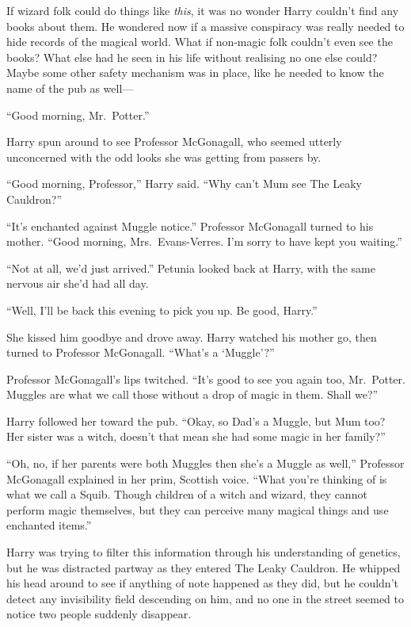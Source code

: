 If wizard folk could do things like \emph{this}, it was no wonder
Harry couldn’t find any books about them. He wondered
now if a massive conspiracy was really needed to hide
records of the magical world. What if non-magic folk
couldn’t even see the books? What else had he seen in
his life without realising no one else could? Maybe some
other safety mechanism was in place, like he needed to
know the name of the pub as well—

“Good morning, Mr.~Potter.”

Harry spun around to see Professor McGonagall, who
seemed utterly unconcerned with the odd
looks she was getting from passers by.

“Good morning, Professor,” Harry said. “Why can’t Mum
see The Leaky Cauldron?”

“It’s enchanted against Muggle notice.” Professor McGonagall
turned to his mother. “Good morning, Mrs.~Evans-Verres.
I’m sorry to have kept you waiting.”

“Not at all, we’d just arrived.” Petunia looked back at
Harry, with the same nervous air she’d had all day.

“Well, I’ll be back this evening to pick you up. Be good, Harry.”

She kissed him goodbye and drove away. Harry watched his mother
go, then turned to Professor McGonagall. “What’s a ‘Muggle’?”

Professor McGonagall’s lips twitched. “It’s good to see you
again too, Mr.~Potter. Muggles are what we call those
without a drop of magic in them. Shall we?”

Harry followed her toward the pub. “Okay, so Dad’s a
Muggle, but Mum too? Her sister was a witch, doesn’t that
mean she had some magic in her family?”

“Oh, no, if her parents were both Muggles then she’s
a Muggle as well,” Professor McGonagall explained in her prim,
Scottish voice. “What you’re thinking of is what we call a
Squib. Though children of a witch and wizard, they cannot
perform magic themselves, but they can perceive
many magical things and use enchanted items.”

Harry was trying to filter this information through his
understanding of genetics, but he was distracted partway as
they entered The Leaky Cauldron. He whipped his head
around to see if anything of note happened as they did,
but he couldn’t detect any invisibility field descending on him,
and no one in the street seemed to notice two people
suddenly disappear.

